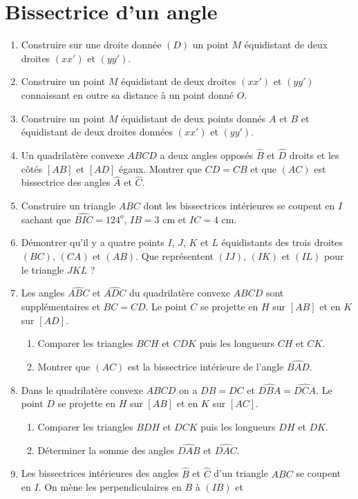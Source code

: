 
\chapter{Bissectrice d'un angle}
\begin{enumerate}
\item Construire sur une droite donnée $(D)$ un point $M$ équidistant de deux droites
$(xx')$ et $(yy')$.
\item Construire un point $M$ équidistant de deux droites $(xx')$ et $(yy')$ connaissant en outre sa distance à un point donné $O$. 
\item Construire un point $M$ équidistant de deux points donnés $A$ et $B$ et 
équidistant de deux droites données $(xx')$ et $(yy')$.
\item Un quadrilatère convexe $ABCD$ a deux angles opposés $\widehat{B}$ et $\widehat{D}$ droits et les côtés $[AB]$ et $[AD]$ égaux. Montrer que $CD=CB$
et que $(AC)$ est bissectrice des angles $\widehat{A}$ et $\widehat{C}$. 
\item Construire un triangle $ABC$ dont les bissectrices intérieures
se coupent en $I$ sachant que $\widehat{BIC}=124^o$, $IB=3$ cm et $IC = 4$ cm.
\item Démontrer qu'il y a quatre points $I$, $J$, $K$ et $L$ équidistants des trois droites $(BC)$, $(CA)$ et $(AB)$. Que représentent $(IJ)$, $(IK)$ et $(IL)$ pour
le triangle $JKL$ ?
\item Les angles $\widehat{ABC}$ et $\widehat{ADC}$ du quadrilatère convexe $ABCD$ 
sont supplémentaires et $BC=CD$. Le point $C$ se projette en $H$ sur $[AB]$ et en 
$K$ sur $[AD]$. \begin{enumerate}
\item Comparer les triangles $BCH$ et $CDK$ puis les longueurs $CH$ et $CK$.
\item Montrer que $(AC)$ est la bissectrice intérieure de l'angle $\widehat{BAD}$.
\end{enumerate}
\item Dans le quadrilatère convexe $ABCD$ on a $DB=DC$ et $\widehat{DBA}=\widehat{DCA}$. Le point $D$ se projette en $H$ sur $[AB]$ et en $K$ sur $[AC]$.
\begin{enumerate}
\item Comparer les triangles $BDH$ et $DCK$ puis les longueurs $DH$ et $DK$. 
\item Déterminer la somme des angles $\widehat{DAB}$ et $\widehat{DAC}$.
\end{enumerate}
\item Les bissectrices intérieures des angles $\widehat{B}$ et $\widehat{C}$ d'un triangle $ABC$ se coupent en $I$. On mène les perpendiculaires en $B$ à $(IB)$ et 

\end{enumerate}
